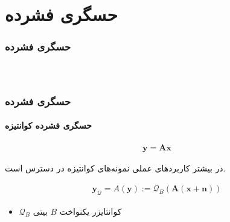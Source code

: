 \begin{frame}
\tableofcontents
\end{frame}


\section{حسگری فشرده\hfill}
\begin{frame}
\frametitle{حسگری فشرده}

\begin{columns} 
\begin{figure}
	\centering
	
\end{figure}
\end{columns}
\end{frame}
\begin{frame}
\frametitle{حسگری فشرده}
\framesubtitle{حسگری فشرده کوانتیزه}
\begin{align}
\label{eq2}
\bm{y}=\bm{A}\bm{x}
\end{align}
\pause
\begin{block}{}
\centering
در بیشتر کاربرد‌های عملی نمونه‌های کوانتیزه در دسترس است.
\end{block}

\begin{align}
\label{eq3}
\bm{y}_{\mathcal{Q}} =A(\bm{y}):= \mathcal{Q}_{B}\left(\bm{A}(\bm{x}+\bm{n})\right)
\end{align}
\begin{itemize}
\item{$\mathcal{Q}_{B}$
کوانتایزر یکنواخت
$B$
بیتی}
\end{itemize}

\end{frame}
